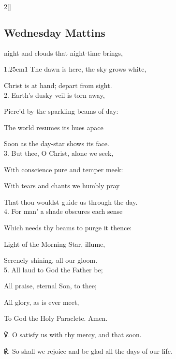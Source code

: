 \begin{paracol}{2}[]
\sloppy

\subsection{Wednesday Mattins}\label{WednesdayMattins}

 night and clouds that night-time brings,


\begin{hangparas}{1.25em}{1}
The dawn is here, the sky grows white,

Christ is at hand; depart from sight.\\

2. Earth's dusky veil is torn away,

Pierc'd by the sparkling beams of day:

The world resumes its hues apace

Soon as the day-star shows its face.\\

3. But thee, O Christ, alone we seek,

With conscience pure and temper meek:

With tears and chants we humbly pray

That thou wouldst guide us through the day.\\

4. For man' a shade obscures each sense

Which needs thy beams to purge it thence:

Light of the Morning Star, illume,

Serenely shining, all our gloom.\\

5. All laud to God the Father be;

All praise, eternal Son, to thee;

All glory, as is ever meet,

To God the Holy Paraclete. Amen.\\
\end{hangparas}

℣. O satisfy us with thy mercy, and that soon.

℟. So shall we rejoice and be glad all the days of our life.



\end{paracol}

